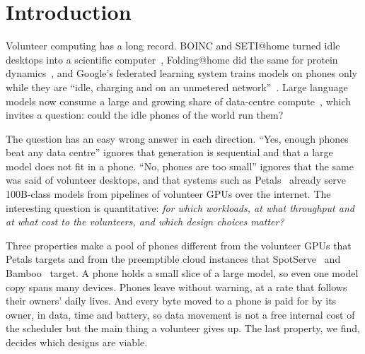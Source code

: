 \documentclass[preprint,review,12pt,authoryear]{elsarticle}
\begin{document}
\linenumbers

\section{Introduction}
\label{sec:intro}

Volunteer computing has a long record. BOINC and SETI@home turned idle desktops
into a scientific computer~\citep{boinc,anderson2006}, Folding@home did the
same for protein dynamics~\citep{foldingathome}, and Google's federated
learning system trains models on phones only while they are ``idle, charging
and on an unmetered network''~\citep{bonawitz2019}. Large language models now
consume a large and growing share of data-centre compute~\citep{samsi2023,luccioni2024},
which invites a question: could the idle phones of the world run them?

The question has an easy wrong answer in each direction. ``Yes, enough phones
beat any data centre'' ignores that generation is sequential and that a large
model does not fit in a phone. ``No, phones are too small'' ignores that the
same was said of volunteer desktops, and that systems such as
Petals~\citep{petals-acl,petals-neurips} already serve 100B-class models from
pipelines of volunteer GPUs over the internet. The interesting question is
quantitative: \emph{for which workloads, at what throughput and at what cost to
the volunteers, and which design choices matter?}

Three properties make a pool of phones different from the volunteer GPUs that
Petals targets and from the preemptible cloud instances that
SpotServe~\citep{spotserve} and Bamboo~\citep{bamboo} target. A phone holds a
small slice of a large model, so even one model copy spans many devices.
Phones leave without warning, at a rate that follows their owners' daily lives.
And every byte moved to a phone is paid for by its owner, in data, time and
battery, so data movement is not a free internal cost of the scheduler but the
main thing a volunteer gives up. The last property, we find, decides which
designs are viable.
\end{document}
